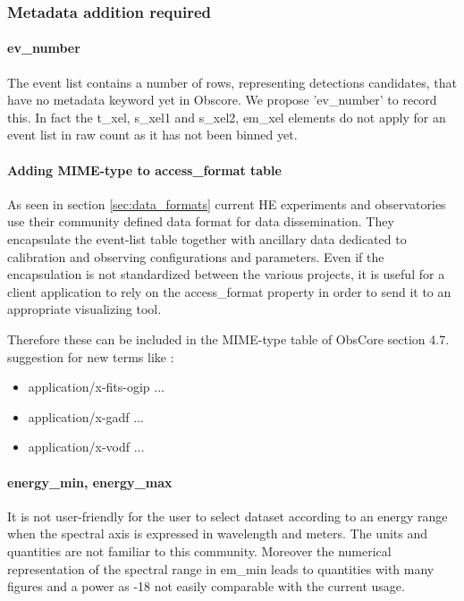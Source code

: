 \documentclass[11pt,a4paper]{ivoa}
\begin{document}
\subsubsection{Metadata addition required}

\paragraph{ev\_number}
The event list contains a number of rows, representing detections candidates, that have no metadata keyword yet in Obscore.
We propose 'ev\_number' to record this.
In fact the t\_xel, s\_xel1 and s\_xel2, em\_xel elements do not apply for an event list in raw count as it has not been binned yet.

\paragraph{Adding MIME-type to access\_format table}
As seen in section \ref{sec:data_formats} current HE experiments and observatories use their community defined data format for data dissemination.
They encapsulate the event-list table together with ancillary data dedicated to calibration and observing configurations and parameters.
Even if the encapsulation is not standardized between the various projects, it is useful for a client application to rely on the access\_format property in order to send it to an appropriate visualizing tool.

Therefore these can be included in the MIME-type table of ObsCore section 4.7. suggestion for new terms like :
\begin{itemize}
\item application/x-fits-ogip ...
\item application/x-gadf  ...
\item application/x-vodf  ...
\end{itemize}

\paragraph{energy\_min, energy\_max}
It is not user-friendly for the user to select dataset according to an energy range when the spectral axis is expressed in wavelength and meters. The units and quantities are not familiar to this community.
Moreover the numerical representation of the spectral range in em\_min leads to quantities with many figures and a power as -18 not easily comparable with the current usage.
\end{document}
